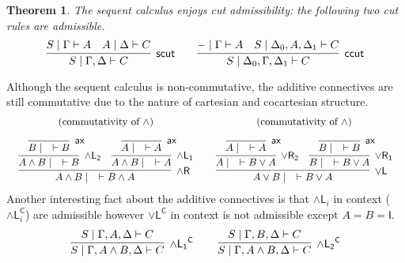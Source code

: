 \documentclass[submission,copyright,creativecommons]{eptcs}
\newtheorem{theorem}{Theorem}[section]
\theoremstyle{definition}
\newcommand{\andlone}{\land \mathsf{L_{1}}}
\newcommand{\andltwo}{\land \mathsf{L_{2}}}
\newcommand{\andli}{\land \mathsf{L}_{i}}
\newcommand{\andr}{\land \mathsf{R}}
\newcommand{\orl}{\lor \mathsf{L}}
\newcommand{\orrone}{\lor \mathsf{R_{1}}}
\newcommand{\orrtwo}{\lor \mathsf{R_{2}}}
\newcommand{\ax}{\mathsf{ax}}
\newcommand{\I}{\mathsf{I}}
\newcommand{\proofbox}[1]{\begin{tabular}{l} #1 \end{tabular}}
\begin{document}
\begin{theorem}
  The sequent calculus enjoys cut admissibility: the following two cut rules are admissible.
    \begin{displaymath}
      \infer[\mathsf{scut}]{S \mid \Gamma , \Delta \vdash C}{
        S \mid \Gamma \vdash A
        &
        A \mid \Delta \vdash C
      }
      \qquad
      \infer[\mathsf{ccut}]{S \mid \Delta_0 , \Gamma , \Delta_1 \vdash C}{
        {-} \mid \Gamma \vdash A
        &
        S \mid \Delta_0 , A , \Delta_1 \vdash C
      }
    \end{displaymath}
  \end{theorem}
  Although the sequent calculus is non-commutative, the additive connectives are still commutative due to the nature of cartesian and cocartesian structure.
  \begin{displaymath}
    \begin{array}{cc}
      (\text{commutativity of } \land) & (\text{commutativity of } \land)
      \\[10pt]
      \proofbox{
        \infer[\andr]{A \land B \mid \quad \vdash B \land A}{
          \infer[\andltwo]{A \land B \mid \quad \vdash B}{
            \infer[\ax]{B \mid \quad \vdash B}{}
          }
          &
          \infer[\andlone]{A \land B \mid \quad \vdash A}{
            \infer[\ax]{A \mid \quad \vdash A}{}
          }
        }
      }
      &
      \proofbox{
        \infer[\orl]{A \lor B \mid \quad \vdash B \lor A}{
          \infer[\orrtwo]{A \mid \quad \vdash B \lor A}{
            \infer[\ax]{A \mid \quad \vdash A}{}
          }
          &
          \infer[\orrone]{B \mid \quad \vdash B \lor A}{
            \infer[\ax]{B \mid \quad \vdash B}{}
          }
        }
      }
    \end{array}
  \end{displaymath}
  Another interesting fact about the additive connectives is that $\andli$ in context ($\andli^{\mathsf{C}}$) are admissible however $\orl^{\mathsf{C}}$ in context is not admissible except $A = B = \I$.
  \begin{displaymath}
    \begin{array}{c}
      \proofbox{
        \infer[\andlone^{\mathsf{C}}]{S \mid \Gamma , A \land B , \Delta \vdash C}{
          S \mid \Gamma , A ,\Delta \vdash C
        }
      }
      \quad
      \proofbox{
        \infer[\andltwo^{\mathsf{C}}]{S \mid \Gamma , A \land B , \Delta \vdash C}{
          S \mid \Gamma , B ,\Delta \vdash C
        }
      }
    \end{array}
  \end{displaymath}
\end{document}

